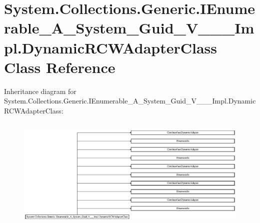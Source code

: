 \hypertarget{class_system_1_1_collections_1_1_generic_1_1_i_enumerable___a___system___guid___v_______impl_1_1_dynamic_r_c_w_adapter_class}{}\section{System.\+Collections.\+Generic.\+I\+Enumerable\+\_\+\+A\+\_\+\+System\+\_\+\+Guid\+\_\+\+V\+\_\+\+\_\+\+\_\+\+Impl.\+Dynamic\+R\+C\+W\+Adapter\+Class Class Reference}
\label{class_system_1_1_collections_1_1_generic_1_1_i_enumerable___a___system___guid___v_______impl_1_1_dynamic_r_c_w_adapter_class}
Inheritance diagram for System.\+Collections.\+Generic.\+I\+Enumerable\+\_\+\+A\+\_\+\+System\+\_\+\+Guid\+\_\+\+V\+\_\+\+\_\+\+\_\+\+Impl.\+Dynamic\+R\+C\+W\+Adapter\+Class\+:\begin{figure}[H]
\begin{center}
\leavevmode
\includegraphics[height=5.490196cm]{class_system_1_1_collections_1_1_generic_1_1_i_enumerable___a___system___guid___v_______impl_1_1_dynamic_r_c_w_adapter_class}
\end{center}
\end{figure}
